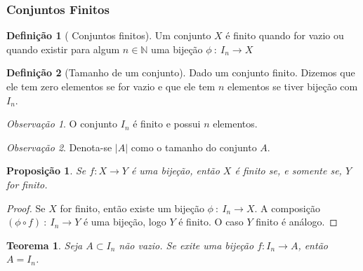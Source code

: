 \documentclass{article}
\theoremstyle{plain}
\newtheorem{prop}{Proposição}[section]
\newtheorem{teo}{Teorema}
\theoremstyle{definition}
\newtheorem{definicao}{Definição}[section]
\theoremstyle{remark}
\newtheorem{obs}{Observação}[section]
\begin{document}
\subsubsection{Conjuntos Finitos}
\begin{definicao}[ Conjuntos finitos]
	Um conjunto $X$ é finito quando for vazio ou quando existir para algum $n\in \mathbb{N}$ uma bijeção $\phi \: :\: I_n \to X$
\end{definicao}
\begin{definicao}[Tamanho de um conjunto]
	Dado um conjunto finito. Dizemos que ele tem zero elementos se for vazio e que ele tem $n$ elementos se tiver bijeção com $I_n$.
\end{definicao}
\begin{obs}
	O conjunto $I_n$ é finito e possui $n$ elementos. 
\end{obs}
\begin{obs}
	Denota-se $|A|$ como o tamanho do conjunto $A$.
\end{obs}
\begin{prop}
	Se $f:X\to Y$ é uma bijeção, então $X$ é finito se, e somente se, $Y$ for finito.
\end{prop}
\begin{proof}
	Se $X$ for finito, então existe um bijeção $\phi \: : \: I_n \to X$.  A composição $(\phi \circ f) \: : \: I_n \to Y$ é uma bijeção, logo $Y$ é finito. O caso $Y$ finito é análogo.
\end{proof}
\begin{teo}
	Seja $A\subset I_n$ não vazio. Se exite uma bijeção $f: I_n \to A$, então $A = I_n$.
	\label{TeoremaSubFinito}
\end{teo}
\end{document}
